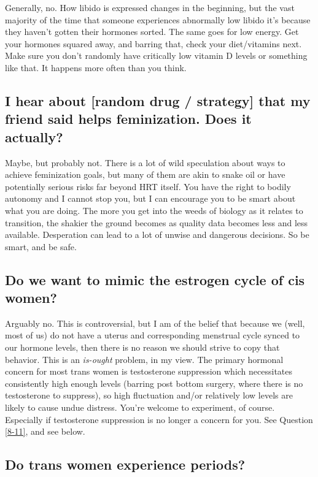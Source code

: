 \documentclass{article}
\begin{document}
Generally, no. How libido is expressed changes in the beginning, but the vast majority of the time that someone experiences abnormally low libido it’s because they haven’t gotten their hormones sorted. The same goes for low energy. Get your hormones squared away, and barring that, check your diet/vitamins next. Make sure you don’t randomly have critically low vitamin D levels or something like that. It happens more often than you think.

\subsection{I hear about [random drug / strategy] that my friend said helps feminization. Does it actually?}

Maybe, but probably not. There is a lot of wild speculation about ways to achieve feminization goals, but many of them are akin to snake oil or have potentially serious risks far beyond HRT itself. You have the right to bodily autonomy and I cannot stop you, but I can encourage you to be smart about what you are doing. The more you get into the weeds of biology as it relates to transition, the shakier the ground becomes as quality data becomes less and less available. Desperation can lead to a lot of unwise and dangerous decisions. So be smart, and be safe.

\subsection{Do we want to mimic the estrogen cycle of cis women?}\label{11-10}

Arguably no. This is controversial, but I am of the belief that because we (well, most of us) do not have a uterus and corresponding menstrual cycle synced to our hormone levels, then there is no reason we should strive to copy that behavior. This is an \textit{is-ought} problem, in my view. The primary hormonal concern for most trans women is testosterone suppression which necessitates consistently high enough levels (barring post bottom surgery, where there is no testosterone to suppress), so high fluctuation and/or relatively low levels are likely to cause undue distress. You’re welcome to experiment, of course. Especially if testosterone suppression is no longer a concern for you. See Question \ref{8-11}, and see below.

\subsection{Do trans women experience periods?}
\end{document}
